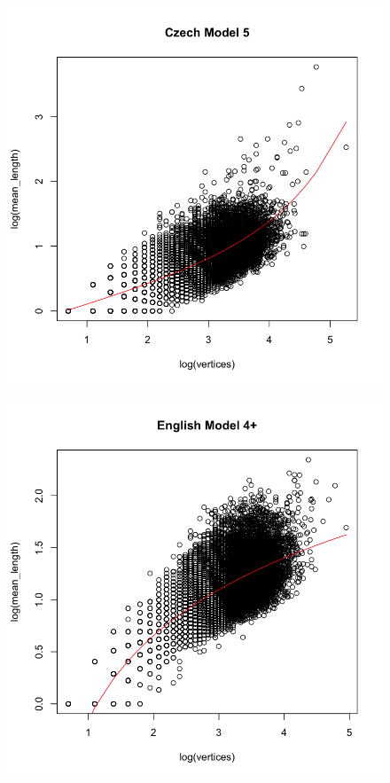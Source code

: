 \documentclass[paper=a4, fontsize=11pt]{scrartcl} %
\begin{document}
\begin{figure}
\begin{minipage}{.5\textwidth}
  \label{fig:4}
\end{minipage}
\end{figure}

\begin{figure}
\centering
\begin{minipage}{.5\textwidth}
  \centering
  \includegraphics[width=\linewidth]{bestModel_Czech.png}
  \label{fig:5}
\end{minipage}%
\begin{minipage}{.5\textwidth}
  \centering
  \includegraphics[width=\linewidth]{bestModel_English.png}

\end{minipage}
\end{figure}
\end{document}
